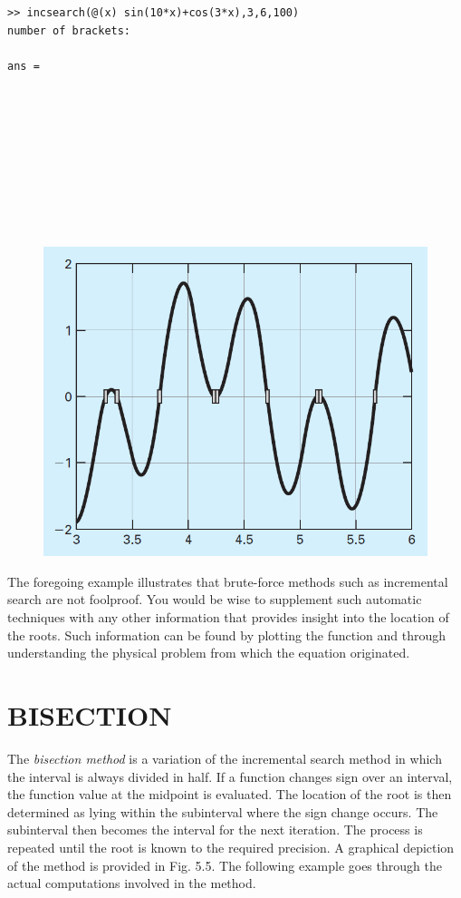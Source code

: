 \documentclass[../main.tex]{subfiles}
\begin{document}
\begin{example}
    \texttt{>> incsearch(@(x) sin(10*x)+cos(3*x),3,6,100)\\
    number of brackets:\\
    \\
    ans =\\
         \\
         \\
         \\
         \\
         \\
         \\
         \\
         \\
         \\}

    \begin{figure}[h]
        \includegraphics[width=0.65\linewidth]{./images/example_5_2_2}
    \end{figure}

    The foregoing example illustrates that brute-force methods such as incremental search
    are not foolproof. You would be wise to supplement such automatic techniques with any
    other information that provides insight into the location of the roots. Such information can
    be found by plotting the function and through understanding the physical problem from
    which the equation originated.
\end{example}

\section[BISECTION]{BISECTION}
\noindent 
The \emph{bisection method} is a variation of the incremental search method in which the interval
is always divided in half. If a function changes sign over an interval, the function value at
the midpoint is evaluated. The location of the root is then determined as lying within the
subinterval where the sign change occurs. The subinterval then becomes the interval for
the next iteration. The process is repeated until the root is known to the required precision.
A graphical depiction of the method is provided in Fig. 5.5. The following example goes
through the actual computations involved in the method.
\end{document}
